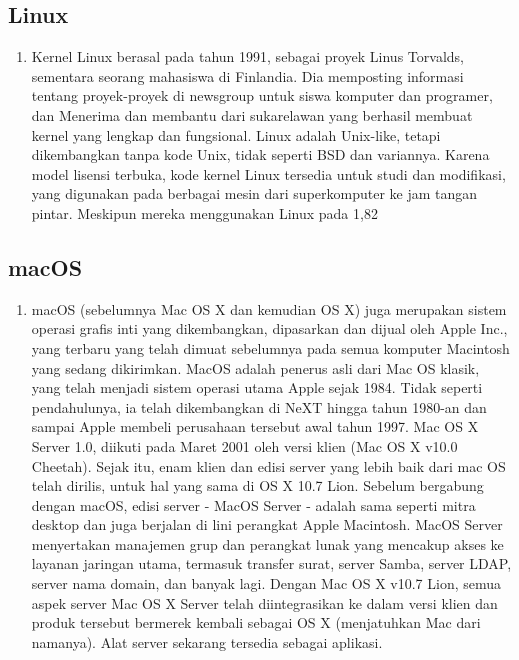 \subsection{Linux}
	\begin{enumerate}
		\item Kernel Linux berasal pada tahun 1991, sebagai proyek Linus Torvalds, sementara seorang mahasiswa di Finlandia. Dia memposting informasi tentang proyek-proyek di newsgroup untuk siswa komputer dan programer, dan Menerima dan membantu dari sukarelawan yang berhasil membuat kernel yang lengkap dan fungsional. Linux adalah Unix-like, tetapi dikembangkan tanpa kode Unix, tidak seperti BSD dan variannya. Karena model lisensi terbuka, kode kernel Linux tersedia untuk studi dan modifikasi, yang digunakan pada berbagai mesin dari superkomputer ke jam tangan pintar. Meskipun mereka menggunakan Linux pada 1,82%
	\end{enumerate}
\subsection{macOS}
	\begin{enumerate}
		\item macOS (sebelumnya Mac OS X dan kemudian OS X) juga merupakan sistem operasi grafis inti yang dikembangkan, dipasarkan dan dijual oleh Apple Inc., yang terbaru yang telah dimuat sebelumnya pada semua komputer Macintosh yang sedang dikirimkan. MacOS adalah penerus asli dari Mac OS klasik, yang telah menjadi sistem operasi utama Apple sejak 1984. Tidak seperti pendahulunya, ia telah dikembangkan di NeXT hingga tahun 1980-an dan sampai Apple membeli perusahaan tersebut awal tahun 1997. Mac OS X Server 1.0, diikuti pada Maret 2001 oleh versi klien (Mac OS X v10.0 Cheetah). Sejak itu, enam klien dan edisi server yang lebih baik dari mac OS telah dirilis, untuk hal yang sama di OS X 10.7 Lion. Sebelum bergabung dengan macOS, edisi server - MacOS Server - adalah sama seperti mitra desktop dan juga berjalan di lini perangkat Apple Macintosh. MacOS Server menyertakan manajemen grup dan perangkat lunak yang mencakup akses ke layanan jaringan utama, termasuk transfer surat, server Samba, server LDAP, server nama domain, dan banyak lagi. Dengan Mac OS X v10.7 Lion, semua aspek server Mac OS X Server telah diintegrasikan ke dalam versi klien dan produk tersebut bermerek kembali sebagai OS X (menjatuhkan Mac dari namanya). Alat server sekarang tersedia sebagai aplikasi.
	\end{enumerate}
